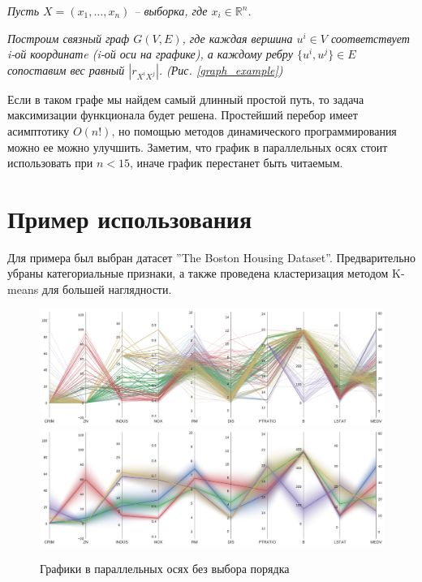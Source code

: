 \documentclass[12pt,fleqn]{article}
\begin{document}
 \vspace{10pt}

 \noindent \textit{Пусть $X=(x_1,\ldots,x_n)$ -- выборка, где $x_i\in \mathbb{R}^n$.}

 \vspace{5pt}

 \noindent \textit{Построим связный граф $G(V,E)$, где каждая вершина $u^i \in V$ соответствует
 i-ой координатe (i-ой оси на графике), а каждому ребру $\{u^i,u^j\} \in E$ сопоставим вес равный $|r_{X^iX^j}|$. (Рис. \ref{graph_example})}

\vspace{10pt}

Если в таком графе мы найдем самый длинный простой путь, то задача максимизации функционала будет решена. 
Простейший перебор имеет асимптотику $O(n!)$, но помощью методов динамического программирования можно ее можно улучшить. Заметим, что 
график в параллельных осях стоит использовать при $n < 15$, иначе график перестанет быть читаемым.

\section{Пример использования}
Для примера был выбран датасет ''The Boston Housing Dataset''. Предварительно убраны категориальные признаки, 
а также проведена кластеризация методом K-means для большей наглядности.

\begin{figure}[htb]
    \centering
    \includegraphics[width=15cm]{housing_example_1.pdf}\\
    \includegraphics[width=15cm]{housing_example_3.pdf}
    \caption{Графики в параллельных осях без выбора порядка}
    \label{house_example_1}
\end{figure}
\end{document}

